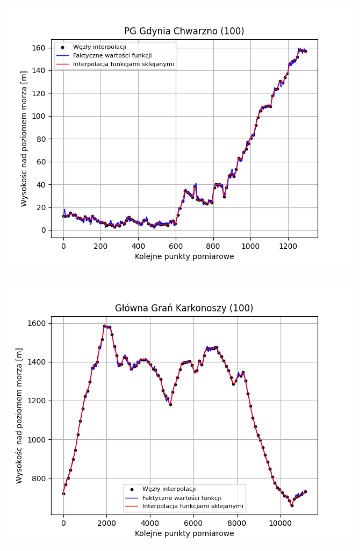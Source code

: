 \documentclass[fleqn]{article}
\begin{document}
    \begin{figure}[h]
        \centering
        \begin{subfigure}{.33\textwidth}
            \centering
            \includegraphics[width=\linewidth]{plot_100_points_PG_Gdynia_Chwarzno.png}
            \label{fig:sub1}
        \end{subfigure}
        \begin{subfigure}{.33\textwidth}
          \centering
          \includegraphics[width=\linewidth]{plot_100_points_Główna_Grań_Karkonoszy.png}
          \label{fig:sub2}
        \end{subfigure}%
        \begin{subfigure}{.33\textwidth}
          \centering

\end{subfigure}
\end{figure}
\end{document}
